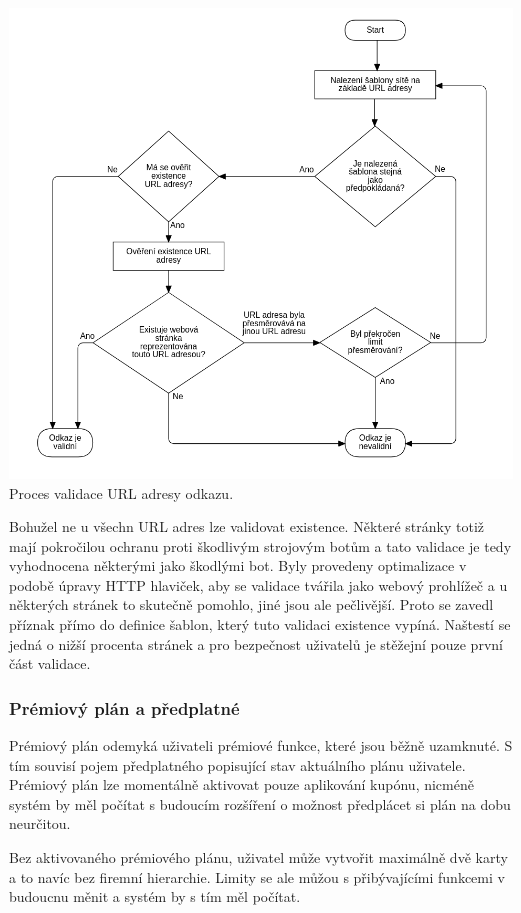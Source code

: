 			\includegraphics{obrazky/proces_validace_odkazu}\hfill
			Proces validace URL adresy odkazu. %

			Bohužel ne u všechn URL adres lze validovat existence.
			Některé stránky totiž mají pokročilou ochranu proti škodlivým strojovým botům a tato validace je tedy
			vyhodnocena některými jako škodlými bot.
			Byly provedeny optimalizace v podobě úpravy \ac{HTTP} hlaviček, aby se validace tvářila jako webový prohlížeč
			a u některých stránek to skutečně pomohlo, jiné jsou ale pečlivější.
			Proto se zavedl příznak přímo do definice šablon, který tuto validaci existence vypíná.
			Naštestí se jedná o nižší procenta stránek a pro bezpečnost uživatelů je stěžejní pouze první část validace.

		\subsubsection{Prémiový plán a předplatné}

		Prémiový plán odemyká uživateli prémiové funkce, které jsou běžně uzamknuté.
		S tím souvisí pojem předplatného popisující stav aktuálního plánu uživatele.
		Prémiový plán lze momentálně aktivovat pouze aplikování kupónu, nicméně systém by měl počítat s budoucím rozšíření
		o možnost předplácet si plán na dobu neurčitou.

		Bez aktivovaného prémiového plánu, uživatel může vytvořit maximálně dvě karty a to navíc bez firemní hierarchie.
		Limity se ale můžou s přibývajícími funkcemi v budoucnu měnit a systém by s tím měl počítat.

